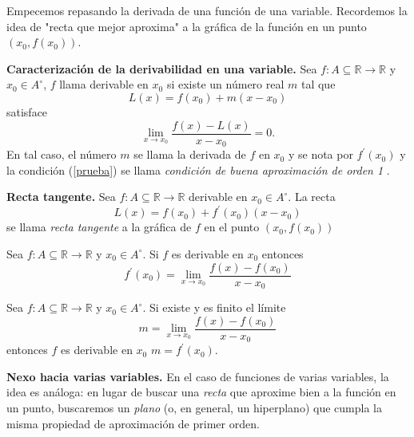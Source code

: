 \label{sec:diferenciabilidad}

Empecemos repasando la derivada de una funci\'on de una variable.  Recordemos la idea de "recta que
mejor aproxima" a la gr\'afica de la funci\'on en un punto $(x_0, f(x_0)).$ 

\begin{definition} \textbf{Caracterización de la derivabilidad en una variable.}\label{recta_tangente}
Sea $f: A\subseteq  \mathbb{R}\to\mathbb{R}$ y $x_0 \in A^{\circ}$,   $f$ llama  derivable en $x_0$  si  existe un número real $m$ tal que
$$ L(x) = f(x_0) + m(x-x_0) $$    satisface
\begin{equation}\label{prueba}
 \lim_{x\to x_0} \frac{f(x) - L(x)}{x-x_0} = 0. 
\end{equation} En tal caso,  el n\'umero $m$ se llama la derivada de $f$ en $x_0$ y se nota por $ f^{'}(x_0)$ y  la condici\'on (\ref{prueba})  se llama  \emph{ condición de buena aproximación de orden 1 }.  
\end{definition}

\begin{definition}\textbf{Recta tangente.}   Sea $f: A\subseteq  \mathbb{R}\to\mathbb{R}$ derivable en $x_0 \in A^{\circ}$.   La recta 
 $$L(x) = f(x_0) + f^{'}(x_0)(x-x_0)$$ se llama  \emph{recta tangente} a la gr\'afica de $f$ en el punto $(x_0, f(x_0))$ 
\end{definition}


\begin{propertie}
Sea $f: A \subseteq \mathbb{R} \to \mathbb{R}$ y $x_0 \in A^{\circ}$.   Si  $f$ es  derivable en $x_0$ entonces    
 $$  f^{'}(x_0) = \lim_{x \to x_0} \frac{f(x) - f(x_0)}{x-x_0}$$ 
\end{propertie}

\begin{propertie}
Sea $f: A \subseteq \mathbb{R} \to \mathbb{R}$ y $x_0 \in A^{\circ}$.      
Si existe y es finito el l\'imite $$   m = \lim_{x \to x_0} \frac{f(x) - f(x_0)}{x-x_0}$$ entonces $f$ es  derivable en $x_0$   $m= f^{'}(x_0).$ 
\end{propertie}




\textbf{Nexo hacia varias variables.}  
En el caso de funciones de varias variables, la idea es análoga: 
en lugar de buscar una \emph{recta} que aproxime bien a la función en un punto, 
buscaremos un \emph{plano} (o, en general, un hiperplano) que cumpla la misma 
propiedad de aproximación de primer orden.
















